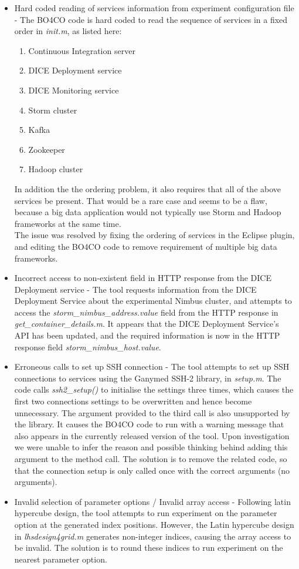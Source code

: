 \begin{itemize}
\item Hard coded reading of services information from experiment configuration file - The BO4CO code is hard coded to read the sequence of services in a fixed order in \textit{init.m}, as listed here: 
	\begin{enumerate}
	\item Continuous Integration server
    \item DICE Deployment service
    \item DICE Monitoring service
    \item Storm cluster
    \item Kafka
    \item Zookeeper
    \item Hadoop cluster
	\end{enumerate}
In addition the the ordering problem, it also requires that all of the above services be present. That would be a rare case and seems to be a flaw, because a big data application would not typically use Storm and Hadoop frameworks at the same time.\\
The issue was resolved by fixing the ordering of services in the Eclipse plugin, and editing the BO4CO code to remove requirement of multiple big data frameworks.
\item Incorrect access to non-existent field in HTTP response from the DICE Deployment service - The tool requests information from the DICE Deployment Service about the experimental Nimbus cluster, and attempts to access the \textit{storm\_nimbus\_address.value} field from the HTTP response in \textit{get\_container\_details.m}. It appears that the DICE Deployment Service's API has been updated, and the required information is now in the HTTP response field \textit{storm\_nimbus\_host.value}.
\item Erroneous calls to set up SSH connection - The tool attempts to set up SSH connections to services using the Ganymed SSH-2 library, in \textit{setup.m}. The code calls \textit{ssh2\_setup()} to initialise the settings three times, which causes the first two connections settings to be overwritten and hence become unnecessary. The argument provided to the third call is also unsupported by the library. It causes the BO4CO code to run with a warning message that also appears in the currently released version of the tool. Upon investigation we were unable to infer the reason and possible thinking behind adding this argument to the method call. The solution is to remove the related code, so that the connection setup is only called once with the correct arguments (no arguments).
\item Invalid selection of parameter options / Invalid array access - Following latin hypercube design, the tool attempts to run experiment on the parameter option at the generated index positions. However, the Latin hypercube design in \textit{lhsdesign4grid.m} generates non-integer indices, causing the array access to be invalid. The solution is to round these indices to run experiment on the nearest parameter option.
\end{itemize}

